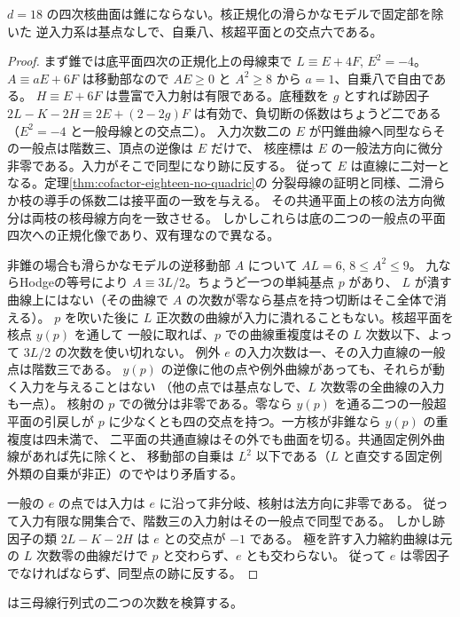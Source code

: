 \begin{proposition}\label{prop:cofactor-eighteen-quartic-no-bases}
$d=18$ の四次核曲面は錐にならない。核正規化の滑らかなモデルで固定部を除いた
逆入力系は基点なしで、自乗八、核超平面との交点六である。
\end{proposition}
\begin{proof}
まず錐では底平面四次の正規化上の母線束で $L\equiv E+4F$, $E^2=-4$。
$A\equiv aE+6F$ は移動部なので $AE\ge0$ と $A^2\ge8$ から $a=1$、自乗八で自由である。
$H\equiv E+6F$ は豊富で入力射は有限である。底種数を $g$ とすれば跡因子
$2L-K-2H\equiv2E+(2-2g)F$ は有効で、負切断の係数はちょうど二である
（$E^2=-4$ と一般母線との交点二）。
入力次数二の $E$ が円錐曲線へ同型ならその一般点は階数三、頂点の逆像は $E$ だけで、
核座標は $E$ の一般法方向に微分非零である。入力がそこで同型になり跡に反する。
従って $E$ は直線に二対一となる。定理\ref{thm:cofactor-eighteen-no-quadric}の
分裂母線の証明と同様、二滑らか枝の導手の係数二は接平面の一致を与える。
その共通平面上の核の法方向微分は両枝の核母線方向を一致させる。
しかしこれらは底の二つの一般点の平面四次への正規化像であり、双有理なので異なる。

非錐の場合も滑らかなモデルの逆移動部 $A$ について $AL=6$, $8\le A^2\le9$。
九ならHodgeの等号により $A\equiv3L/2$。ちょうど一つの単純基点 $p$ があり、
$L$ が潰す曲線上にはない（その曲線で $A$ の次数が零なら基点を持つ切断はそこ全体で消える）。
$p$ を吹いた後に $L$ 正次数の曲線が入力に潰れることもない。核超平面を核点 $y(p)$ を通して
一般に取れば、$p$ での曲線重複度はその $L$ 次数以下、よって $3L/2$ の次数を使い切れない。
例外 $e$ の入力次数は一、その入力直線の一般点は階数三である。
$y(p)$ の逆像に他の点や例外曲線があっても、それらが動く入力を与えることはない
（他の点では基点なしで、$L$ 次数零の全曲線の入力も一点）。
核射の $p$ での微分は非零である。零なら $y(p)$ を通る二つの一般超平面の引戻しが
$p$ に少なくとも四の交点を持つ。一方核が非錐なら $y(p)$ の重複度は四未満で、
二平面の共通直線はその外でも曲面を切る。共通固定例外曲線があれば先に除くと、
移動部の自乗は $L^2$ 以下である（$L$ と直交する固定例外類の自乗が非正）のでやはり矛盾する。

一般の $e$ の点では入力は $e$ に沿って非分岐、核射は法方向に非零である。
従って入力有限な開集合で、階数三の入力射はその一般点で同型である。
しかし跡因子の類 $2L-K-2H$ は $e$ との交点が $-1$ である。
極を許す入力縮約曲線は元の $L$ 次数零の曲線だけで $p$ と交わらず、$e$ とも交わらない。
従って $e$ は零因子でなければならず、同型点の跡に反する。
\end{proof}
 は三母線行列式の二つの次数を検算する。
